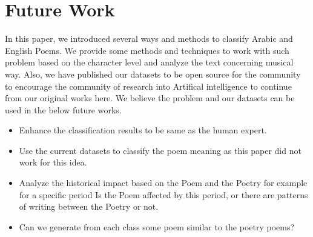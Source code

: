 \section{Future Work}
In this paper, we introduced several ways and methods  to classify Arabic and English Poems. We provide some methods and techniques to work with such problem based on the character level and analyze the text concerning musical way. Also, we have published our datasets to be open source for the community to encourage the community of research into Artifical intelligence to continue from our original works here. We believe the problem and our datasets can be used in the below future works.

\begin{itemize}
\item Enhance the classification results to be same as the human expert.
\item Use the current datasets to classify the poem meaning as this paper did not work for this idea. %
\item Analyze the historical impact based on the Poem and the Poetry for example for a specific period Is the Poem affected by this period, or there are patterns of writing between the Poetry or not.
\item Can we generate from each class some poem similar to the poetry poems?
\end{itemize}
